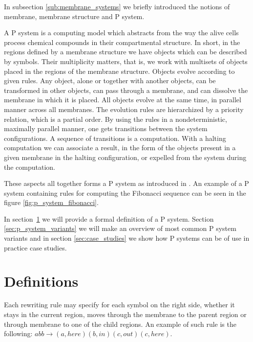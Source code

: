 In subsection \ref{sub:membrane_systems} we briefly introduced the notions of membrane, membrane structure and P system.

A P system \cite{Paun98} is a computing model which abstracts from the way the alive cells process chemical compounds in their compartmental structure. In short, in the regions defined by a membrane structure we have objects which can be described by symbols. Their multiplicity matters, that is, we work with multisets of objects placed in the regions of the membrane structure. Objects evolve according to given rules. Any object, alone or together with another objects, can be transformed in other objects, can pass through a membrane, and can dissolve the membrane in which it is placed. All objects evolve at the same time, in parallel manner across all membranes. The evolution rules are hierarchized by a priority relation, which is a partial order. By using the rules in a nondeterministic, maximally parallel manner, one gets transitions between the system configurations. A sequence of transitions is a computation. With a halting computation we can associate a result, in the form of the objects present in a given membrane in the halting configuration, or expelled from the system during the computation.


These aspects all together forms a P system as introduced in \cite{Paun98}. An example of a P system containing rules for computing the Fibonacci sequence can be seen in the figure \ref{fig:p_system_fibonacci}.

In section~\ref{sec:definitions} we will provide a formal definition of a P system. Section \ref{sec:p_system_variants} we will make an overview of most common P system variants and in section \ref{sec:case_studies} we show how P systems can be of use in practice case studies.

\section{Definitions} %
\label{sec:definitions}




Each rewriting rule may specify for each symbol on the right side, whether it stays in the current region, moves through the membrane to the parent region or through membrane to one of the child regions. An example of such rule is the following: $abb\rightarrow (a,here)(b,in)(c,out)(c,here)$.

